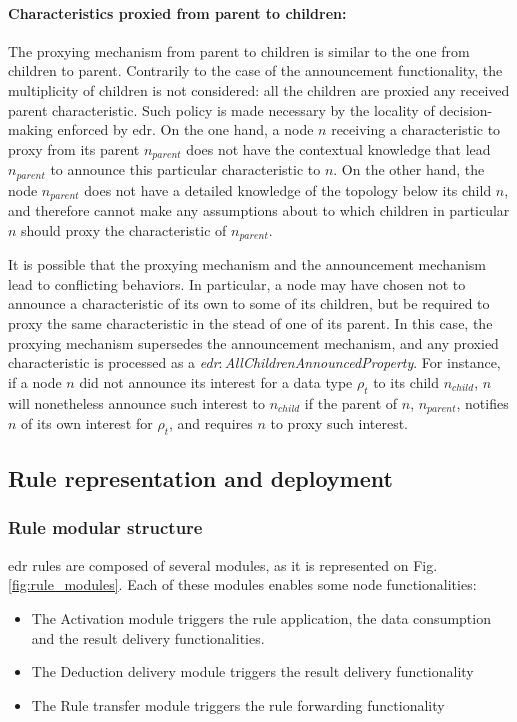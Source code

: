 \documentclass{iosart2c}
\newcommand{\namespace}[1]{\textit{#1$:$}}
\newcommand{\concept}[2]{\namespace{#1}\-\textit{#2}}
\begin{document}
\paragraph{Characteristics proxied from parent to children:}
The proxying mechanism from parent to children is similar to the one from children to parent.
Contrarily to the case of the announcement functionality, the multiplicity of children is not considered: all the children are proxied any received parent characteristic.
Such policy is made necessary by the locality of decision-making enforced by \gls{edr}. 
On the one hand, a node $n$ receiving a characteristic to proxy from its parent $n_{parent}$ does not have the contextual knowledge that lead $n_{parent}$ to announce this particular characteristic to $n$.
On the other hand, the node $n_{parent}$ does not have a detailed knowledge of the topology below its child $n$, and therefore cannot make any assumptions about to which children in particular $n$ should proxy the characteristic of $n_{parent}$.

It is possible that the proxying mechanism and the announcement mechanism lead to conflicting behaviors.
In particular, a node may have chosen not to announce a characteristic of its own to some of its children, but be required to proxy the same characteristic in the stead of one of its parent.
In this case, the proxying mechanism supersedes the announcement mechanism, and any proxied characteristic is processed as a \concept{edr}{All\-Children\-Announced\-Property}.
For instance, if a node $n$ did not announce its interest for a data type $\rho_t$ to its child $n_{child}$, $n$ will nonetheless announce such interest to $n_{child}$ if the parent of $n$, $n_{parent}$, notifies $n$ of its own interest for $\rho_t$, and requires $n$ to proxy such interest.

\subsection{Rule representation and deployment}
\label{subs:edr_rules}

\subsubsection{Rule modular structure}

\gls{edr} rules are composed of several modules, as it is represented on Fig. \ref{fig:rule_modules}. 
Each of these modules enables some node functionalities:

\begin{itemize}
	\item The Activation module triggers the rule application, the data consumption and the result delivery functionalities.
	\item The Deduction delivery module triggers the result delivery functionality
	\item The Rule transfer module triggers the rule forwarding functionality
\end{itemize}
\end{document}
